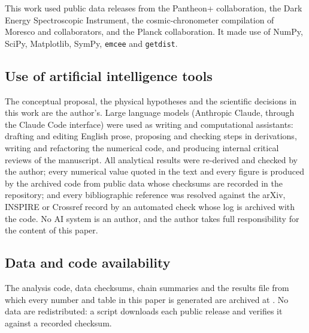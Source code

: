 This work used public data releases from the Pantheon+ collaboration, the Dark
Energy Spectroscopic Instrument, the cosmic-chronometer compilation of Moresco
and collaborators, and the Planck collaboration. It made use of NumPy, SciPy,
Matplotlib, SymPy, \texttt{emcee} and \texttt{getdist}.

\subsection*{Use of artificial intelligence tools}

The conceptual proposal, the physical hypotheses and the scientific decisions
in this work are the author's. Large language models (Anthropic Claude, through
the Claude Code interface) were used as writing and computational assistants:
drafting and editing English prose, proposing and checking steps in
derivations, writing and refactoring the numerical code, and producing internal
critical reviews of the manuscript. All analytical results were re-derived and
checked by the author; every numerical value quoted in the text and every
figure is produced by the archived code from public data whose checksums are
recorded in the repository; and every bibliographic reference was resolved
against the arXiv, INSPIRE or Crossref record by an automated check whose log
is archived with the code. No AI system is an author, and the author takes full
responsibility for the content of this paper.

\subsection*{Data and code availability}

The analysis code, data checksums, chain summaries and the results file from
which every number and table in this paper is generated are archived at
. No data are redistributed: a script downloads each public
release and verifies it against a recorded checksum.
